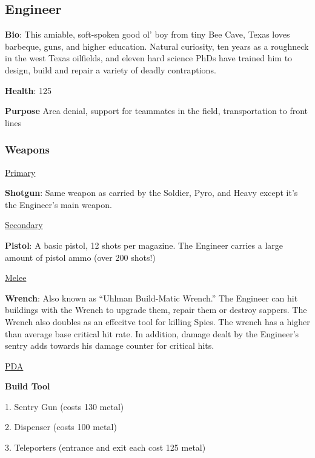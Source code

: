 \subsection{Engineer}
\label{Engineer}
{\bf Bio}:
This amiable, soft-spoken good ol' boy from tiny Bee Cave, Texas loves barbeque, guns, and higher education. Natural curiosity, ten years as a roughneck in the west Texas oilfields, and eleven hard science PhDs have trained him to design, build and repair a variety of deadly contraptions.

{\bf Health}: 125

{\bf Purpose}
Area denial, support for teammates in the field, transportation to front lines

\subsubsection {Weapons}


\begin {center}
\underline {Primary}
\end {center}

{\bf Shotgun}: Same weapon as carried by the Soldier, Pyro, and Heavy except it's the Engineer's main weapon.


\begin {center}
\underline {Secondary}
\end {center}

{\bf Pistol}: A basic pistol, 12 shots per magazine. The Engineer carries a large amount of pistol ammo (over 200 shots!)


\begin {center}
\underline {Melee}
\end {center}

{\bf Wrench}: Also known as ``Uhlman Build-Matic Wrench.” The Engineer can hit buildings with the Wrench to upgrade them, repair them or destroy sappers. The Wrench also doubles as an effecitve tool for killing Spies. The wrench has a higher than average base critical hit rate.  In addition, damage dealt by the Engineer's sentry adds towards his damage counter for critical hits.


\begin {center}
\underline {PDA}
\end {center}
{\bf Build Tool}

1.       Sentry Gun (costs 130 metal)

2.       Dispenser (costs 100 metal)

3.       Teleporters (entrance and exit each cost 125 metal)


